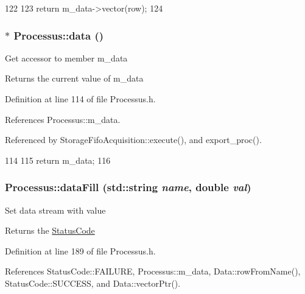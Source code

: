 \begin{DoxyCode}
122                                           {
123     return m_data->vector(row);
124   }
\end{DoxyCode}
\hypertarget{classProcessus_a16e45f329fbce935aeef0ff3cb508228}{
\subsubsection[{data}]{$\ast$ Processus::data ()}}
\label{classProcessus_a16e45f329fbce935aeef0ff3cb508228}
Get accessor to member m\_\-data \begin{DoxyReturn}{Returns}
the current value of m\_\-data 
\end{DoxyReturn}


Definition at line 114 of file Processus.h.

References Processus::m\_\-data.

Referenced by StorageFifoAcquisition::execute(), and export\_\-proc().


\begin{DoxyCode}
114               {
115     return m_data;
116   }
\end{DoxyCode}
\hypertarget{classProcessus_aa31ab71711f7af6a729441ff573f69c9}{
\subsubsection[{dataFill}]{ Processus::dataFill (std::string {\em name}, \/  double {\em val})}}
\label{classProcessus_aa31ab71711f7af6a729441ff573f69c9}
Set data stream with value \begin{DoxyReturn}{Returns}
the \hyperlink{classStatusCode}{StatusCode} 
\end{DoxyReturn}


Definition at line 189 of file Processus.h.

References StatusCode::FAILURE, Processus::m\_\-data, Data::rowFromName(), StatusCode::SUCCESS, and Data::vectorPtr().


